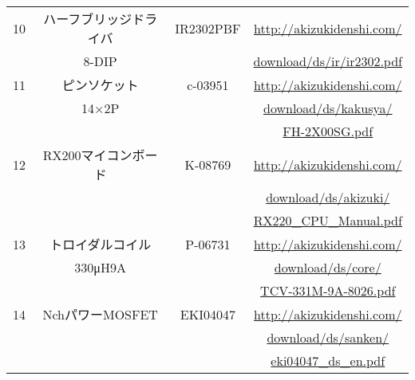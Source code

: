 \begin{tabular}{|c|c|c|c|} \hline
10&ハーフブリッジドライバ&IR2302PBF&\url{http://akizukidenshi.com/}\\
  &8-DIP&    &\url{download/ds/ir/ir2302.pdf}\\ \hline
11&ピンソケット&c-03951&\url{http://akizukidenshi.com/}\\
  &14×2P&    &\url{download/ds/kakusya/}\\
  &      &    &\url{FH-2X00SG.pdf}\\ \hline
12&RX200マイコンボード&K-08769&\url{http://akizukidenshi.com/}\\
  &                   &       &\url{download/ds/akizuki/}\\
  &                   &       &\url{RX220_CPU_Manual.pdf}\\ \hline
13&トロイダルコイル&P-06731&\url{http://akizukidenshi.com/}\\
  &330μH9A&     &\url{download/ds/core/}\\
  &        &     &\url{TCV-331M-9A-8026.pdf}\\ \hline
14&NchパワーMOSFET&EKI04047&\url{http://akizukidenshi.com/}\\
  &               &        &\url{download/ds/sanken/}\\
  &               &        &\url{eki04047_ds_en.pdf}\\ \hline
\end{tabular}

